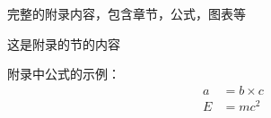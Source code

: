 
\appendix

%
完整的附录内容，包含章节，公式，图表等

这是附录的节的内容

附录中公式的示例：
\begin{align}
a & = b \times c \\
E & = m c^2
\end{align}


